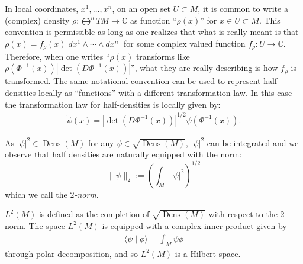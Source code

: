 \documentclass[final,leqno]{siamart}
\DeclareMathOperator{\Dens}{Dens}
\begin{document}
In local coordinates, $x^{1},\dots,x^{n}$, on an open set $U \subset M$, it is common to write a (complex) density $\rho: \bigoplus^{n}TM \to \mathbb{C}$ as function ``$\rho(x)$'' for $x \in U \subset M$.
This convention is permissible as long as one realizes that what is really meant is that $\rho(x) = f_{\rho}(x) | dx^{1} \wedge \cdots \wedge dx^{n} |$ for some complex valued function $f_{\rho}:U \to \mathbb{C}$.
Therefore, when one writes  ``$\rho(x)$ transforms like $\rho( \Phi^{-1}(x)) \left| \det( D \Phi^{-1}(x) ) \right|$'', what they are really describing is how $f_{\rho}$ is transformed.
The same notational convention can be used to represent half-densities locally as ``functions'' with a different transformation law.
In this case the transformation law for half-densities is locally given by:
\begin{align}
	\tilde{\psi}(x) = \left| \det \left( D\Phi^{-1} (x) \right) \right|^{1/2} \psi \left( \Phi^{-1}(x) \right). \label{eq:local transformation law}
\end{align}

As $|\psi|^{2} \in \Dens(M)$ for any $\psi \in \sqrt{\Dens(M)}$, $|\psi|^{2}$ can be integrated and we observe that half densities are naturally equipped with the norm: $$\| \psi \|_2 :=  \left( \int_M |\psi|^2 \right)^{1/2}$$ which we call the \emph{$2$-norm}.
\begin{definition}
	$L^{2}(M)$ is defined as the completion of $\sqrt{ \Dens(M)}$ with respect to the $2$-norm.
	The space $L^{2}(M)$ is equipped with a complex inner-product given by
	\begin{align*}
		\langle \psi \mid \phi \rangle = \int_{M} \bar \psi \phi
	\end{align*}
	through polar decomposition, and so $L^{2}(M)$ is a Hilbert space.
\end{definition}
\end{document}
